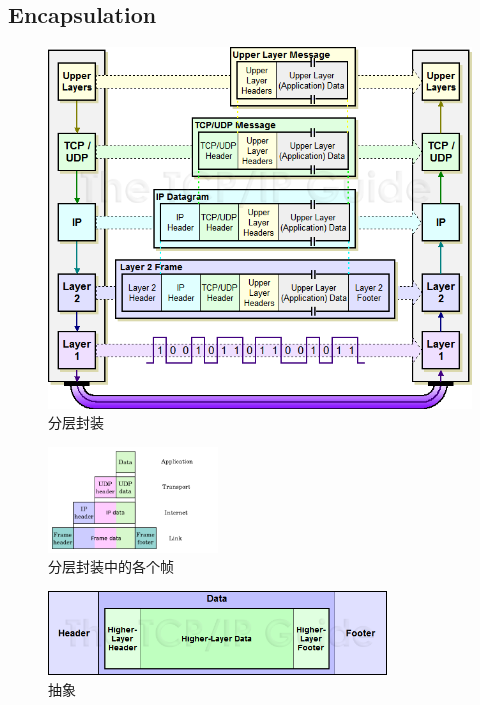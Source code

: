 \documentclass[a4paper]{report}
\begin{document}
\subsection{Encapsulation}
\begin{figure}[H]
\centering
\includegraphics[width=\textwidth]{tcp_encap_2.png}
\caption{分层封装}
\end{figure}

\begin{figure}[H]
\centering
\includegraphics[width=0.4\textwidth]{tcp_encap.png}
\caption{分层封装中的各个帧}
\end{figure}

\begin{figure}[H]
\centering
\includegraphics[width=0.8\textwidth]{funformatting.png}
\caption{抽象}
\end{figure}
\end{document}
